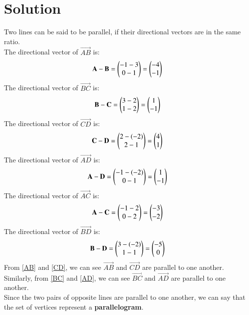 \documentclass[journal,12pt,twocolumn]{IEEEtran}
\begin{document}
\section{Solution}
Two lines can be said to be parallel, if their directional vectors are in the same ratio.\\
The directional vector of $\vec{AB}$ is:
\begin{align}
    \mathbf{A} - \mathbf{B} = \begin{pmatrix}-1-3\\0-1\end{pmatrix} = \begin{pmatrix}-4\\-1\end{pmatrix}
    \label{AB}
\end{align}
The directional vector of $\vec{BC}$ is:
\begin{align}
\mathbf{B} - \mathbf{C} =
    \begin{pmatrix}3-2\\1-2\end{pmatrix} = \begin{pmatrix}1\\-1\end{pmatrix}
    \label{BC}
\end{align}
The directional vector of $\vec{CD}$ is:
\begin{align}
\mathbf{C} - \mathbf{D} =
    \begin{pmatrix}2-(-2)\\2-1\end{pmatrix} = \begin{pmatrix}4\\1\end{pmatrix}
    \label{CD}
\end{align}
The directional vector of $\vec{AD}$ is:
\begin{align}
    \mathbf{A} - \mathbf{D} =
    \begin{pmatrix}-1-(-2)\\0-1\end{pmatrix} = \begin{pmatrix}1\\-1\end{pmatrix}
    \label{AD}
\end{align}
The directional vector of $\vec{AC}$ is:
\begin{align}
\mathbf{A} - \mathbf{C} =
    \begin{pmatrix}-1-2\\0-2\end{pmatrix} = \begin{pmatrix}-3\\-2\end{pmatrix}
    \label{AC}
\end{align}
The directional vector of $\vec{BD}$ is:
\begin{align}
\mathbf{B} - \mathbf{D} =
    \begin{pmatrix}3-(-2)\\1-1\end{pmatrix} = \begin{pmatrix}-5\\0\end{pmatrix}
    \label{BD}
\end{align}
From \eqref{AB} and \eqref{CD}, we can see $\vec{AB}$ and $\vec{CD}$ are parallel to one another. Similarly, from \eqref{BC} and \eqref{AD}, we can see $\vec{BC}$ and $\vec{AD}$ are parallel to one another.\\
Since the two pairs of opposite lines are parallel to one another, we can say that the set of vertices represent a \textbf{parallelogram}.\\
\end{document}

